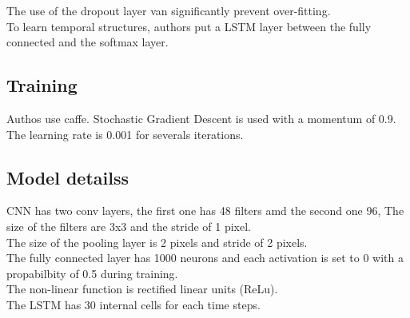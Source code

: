 \documentclass[a4paper]{article}
\begin{document}
The use of the dropout layer van significantly prevent over-fitting.\\

To learn temporal structures, authors put a LSTM layer between the fully connected and the softmax layer.\\

\subsection{Training}
Authos use caffe. Stochastic Gradient Descent is used with a momentum of 0.9. The learning rate is 0.001 for severals iterations.

\subsection{Model detailss}
CNN has two conv layers, the first one has 48 filters amd the second one 96, The size of the filters are 3x3 and the stride of 1 pixel.\\

The size of the pooling layer is 2 pixels and stride of 2 pixels.\\

The fully connected layer has 1000 neurons and each activation is set to 0 with a propabilbity of 0.5 during training.\\

The non-linear function is rectified linear units (ReLu).\\

The LSTM has 30 internal cells for each time steps.\\


\section{}
\end{document}
